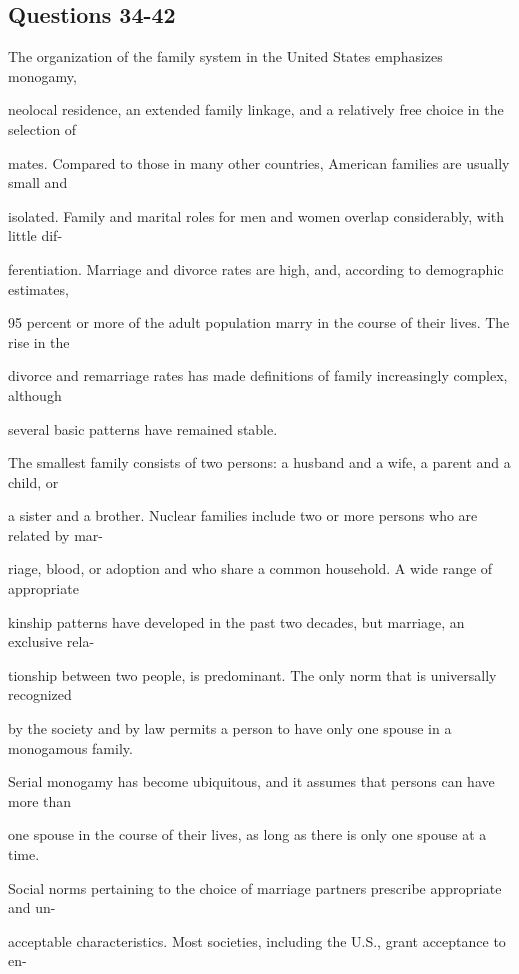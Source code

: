 \documentclass[12pt]{article}
\begin{document}
\subsection*{Questions 34-42}
\begingroup
\small
\sloppy
\setlength{\parskip}{0pt}
\setlength{\parindent}{0pt}
The organization of the family system in the United States emphasizes monogamy,\par
neolocal residence, an extended family linkage, and a relatively free choice in the selection of\par
mates. Compared to those in many other countries, American families are usually small and\par
isolated. Family and marital roles for men and women overlap considerably, with little dif-\par
ferentiation. Marriage and divorce rates are high, and, according to demographic estimates,\par
95 percent or more of the adult population marry in the course of their lives. The rise in the\par
divorce and remarriage rates has made definitions of family increasingly complex, although\par
several basic patterns have remained stable.\par
The smallest family consists of two persons: a husband and a wife, a parent and a child, or\par
a sister and a brother. Nuclear families include two or more persons who are related by mar-\par
riage, blood, or adoption and who share a common household. A wide range of appropriate\par
kinship patterns have developed in the past two decades, but marriage, an exclusive rela-\par
tionship between two people, is predominant. The only norm that is universally recognized\par
by the society and by law permits a person to have only one spouse in a monogamous family.\par
Serial monogamy has become ubiquitous, and it assumes that persons can have more than\par
one spouse in the course of their lives, as long as there is only one spouse at a time.\par
Social norms pertaining to the choice of marriage partners prescribe appropriate and un-\par
acceptable characteristics. Most societies, including the U.S., grant acceptance to en-\par
\end{document}
